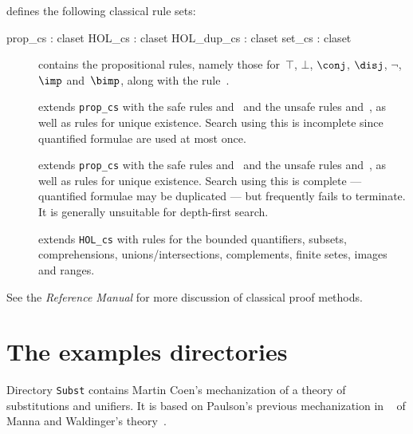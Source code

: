 {\HOL} defines the following classical rule sets:
\begin{ttbox} 
prop_cs    : claset
HOL_cs     : claset
HOL_dup_cs : claset
set_cs     : claset
\end{ttbox}
\begin{description}
\item[] contains the propositional rules, namely
those for~$\top$, $\bot$, $\conj$, $\disj$, $\neg$, $\imp$ and~$\bimp$,
along with the rule~.

\item[] 
extends {\tt prop_cs} with the safe rules  and~
and the unsafe rules  and~, as well as rules for
unique existence.  Search using this is incomplete since quantified
formulae are used at most once.

\item[] 
extends {\tt prop_cs} with the safe rules  and~
and the unsafe rules  and~, as well as
rules for unique existence.  Search using this is complete --- quantified
formulae may be duplicated --- but frequently fails to terminate.  It is
generally unsuitable for depth-first search.

\item[] 
extends {\tt HOL_cs} with rules for the bounded quantifiers, subsets,
comprehensions, unions/intersections, complements, finite setes, images and
ranges.
\end{description}
\noindent
See the {\em Reference Manual} for more discussion of classical proof
methods.


\section{The examples directories}
Directory {\tt Subst} contains Martin Coen's mechanization of a theory of
substitutions and unifiers.  It is based on Paulson's previous
mechanization in {\LCF}~\cite{paulson85} of Manna and Waldinger's
theory~\cite{mw81}. 

